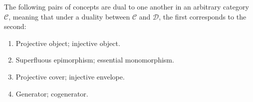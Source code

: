 The following pairs of concepts are dual to one another in an arbitrary category $\mathcal{C}$, meaning that under a duality between $\mathcal{C}$ and $\mathcal{D}$, the first corresponds to the second:

\begin{enumerate}
\item[(1)] Projective object; injective object.
\item[(2)] Superfluous epimorphism; essential monomorphism.
\item[(3)] Projective cover; injective envelope.
\item[(4)] Generator; cogenerator.
\end{enumerate}
